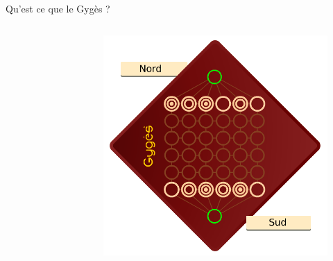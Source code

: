 \documentclass{beamer}
\begin{document}
\begin{frame}{Qu’est ce que le Gygès ?}
\begin{columns}
{{\begin{figure}[h]
						\end{figure}
					} {
						\uncover<4> {
							\begin{figure}[h]
								\centering
								\includegraphics[width=\textwidth]{images/Bases.png}
							\end{figure}
						}
					}
				}
		\end{columns}
	\end{frame}
\end{document}
